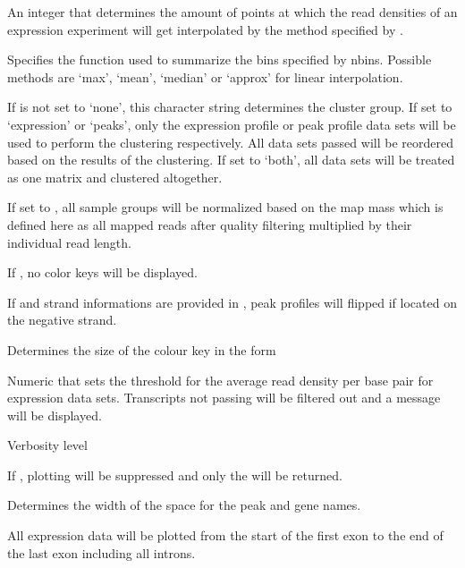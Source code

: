 \documentclass[letterpaper]{book}
\begin{document}
\begin{Arguments}
\begin{ldescription}
\item[\code{ex\_windows}] 
An integer that determines the amount of points at which the read densities of an expression experiment will get interpolated by the method specified by .
 
\item[\code{bin\_method}] 
Specifies the function used to summarize the bins specified by nbins. Possible methods are `max', `mean', `median' or `approx' for linear interpolation. 

\item[\code{gclust}] 
If  is not set to `none', this character string determines the cluster group. If set to `expression' or `peaks', only the expression profile or peak profile data sets will be used to perform the clustering respectively. All data sets passed will be reordered based on the results of the clustering. If set to `both', all data sets will be treated as one matrix and clustered altogether.  

\item[\code{norm\_readc}] 
If set to , all sample groups will be normalized based on the map mass which is defined here as all mapped reads after quality filtering multiplied by their individual read length.

\item[\code{no\_key}] 
If , no color keys will be displayed.  

\item[\code{stranded\_peak}] 
If  and strand informations are provided in , peak profiles will flipped if located on the negative strand.
 
\item[\code{ck\_size}] 
Determines the size of the colour key in the form 
 
\item[\code{remove\_lowex}] 
Numeric that sets the threshold for the average read density per base pair for expression data sets. Transcripts not passing will be filtered out and a message will be displayed.
 
\item[\code{verbose}] 
Verbosity level
 
\item[\code{showPlot}] 
If , plotting will be suppressed and only the  will be returned. 
 
\item[\code{name\_width}] 
Determines the width of the space for the peak and gene names.
 
\item[\code{pre\_mRNA}] 
All expression data will be plotted from the start of the first exon to the end of the last exon including all introns.
 
\end{ldescription}
\end{Arguments}
\end{document}
